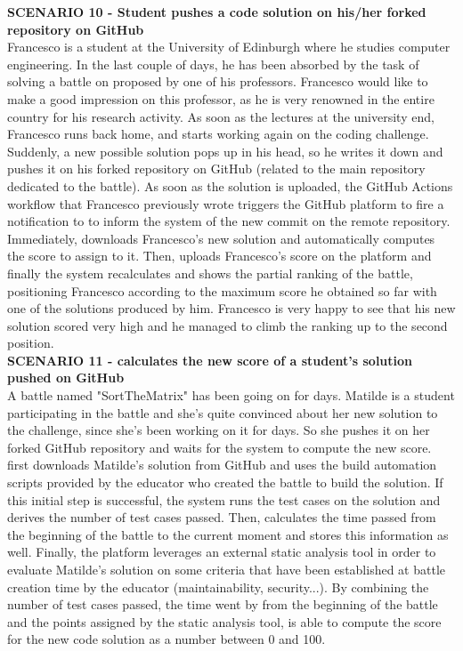     \textbf{SCENARIO 10 - Student pushes a code solution on his/her forked repository on GitHub}\\
    Francesco is a student at the University of Edinburgh where he studies computer engineering. In the last couple of days, he has been absorbed by the task of solving a battle on \app proposed by one of his professors. Francesco would like to make a good impression on this professor, as he is very renowned in the entire country for his research activity.
    As soon as the lectures at the university end, Francesco runs back home, and starts working again on the coding challenge. Suddenly, a new possible solution pops up in his head, so he writes it down and pushes it on his forked repository on GitHub (related to the main repository dedicated to the battle). As soon as the solution is uploaded, the GitHub Actions workflow that Francesco previously wrote triggers the GitHub platform to fire a notification to \app to inform the system of the new commit on the remote repository. Immediately, \app downloads Francesco's new solution and automatically computes the score to assign to it. 
    Then, \app uploads Francesco's score on the platform and finally the system recalculates and shows the partial ranking of the battle, positioning Francesco according to the maximum score he obtained so far with one of the solutions produced by him. 
    Francesco is very happy to see that his new solution scored very high and he managed to climb the ranking up to the second position.\\
    
    \textbf{SCENARIO 11 - \app calculates the new score of a student's solution pushed on GitHub }\\
    A battle named "SortTheMatrix" has been going on for days. Matilde is a student participating in the battle and she's quite convinced about her new solution to the challenge, since she's been working on it for days. So she pushes it on her forked GitHub repository and waits for the system to compute the new score. 
    \app first downloads Matilde's solution from GitHub and uses the build automation scripts provided by the educator who created the battle to build the solution. If this initial step is successful, the system runs the test cases on the solution and derives the number of test cases passed. Then, \app calculates the time passed from the beginning of the battle to the current moment and stores this information as well. Finally, the platform leverages an external static analysis tool in order to evaluate Matilde's solution on some criteria that have been established at battle creation time by the educator (maintainability, security...). By combining the number of test cases passed, the time went by from the beginning of the battle and the points assigned by the static analysis tool, \app is able to compute the score for the new code solution as a number between 0 and 100.  \\
  
